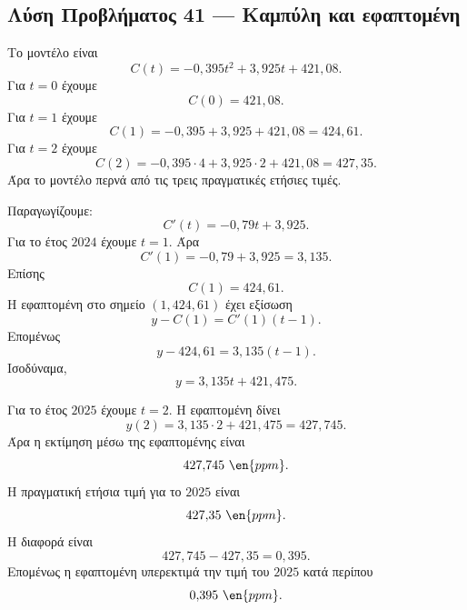\subsection*{Λύση Προβλήματος 41 --- Καμπύλη  και εφαπτομένη}

\begin{alist}
  \item Το μοντέλο είναι
        \[
          C(t)=-0{,}395t^2+3{,}925t+421{,}08.
        \]
        Για $t=0$ έχουμε
        \[
          C(0)=421{,}08.
        \]
        Για $t=1$ έχουμε
        \[
          C(1)=-0{,}395+3{,}925+421{,}08=424{,}61.
        \]
        Για $t=2$ έχουμε
        \[
          C(2)=-0{,}395\cdot4+3{,}925\cdot2+421{,}08=427{,}35.
        \]
        Άρα το μοντέλο περνά από τις τρεις πραγματικές ετήσιες τιμές.

  \item Παραγωγίζουμε:
        \[
          C'(t)=-0{,}79t+3{,}925.
        \]
        Για το έτος $2024$ έχουμε $t=1$. Άρα
        \[
          C'(1)=-0{,}79+3{,}925=3{,}135.
        \]
        Επίσης
        \[
          C(1)=424{,}61.
        \]
        Η εφαπτομένη στο σημείο $(1,424{,}61)$ έχει εξίσωση
        \[
          y-C(1)=C'(1)(t-1).
        \]
        Επομένως
        \[
          {y-424{,}61=3{,}135(t-1)}.
        \]
        Ισοδύναμα,
        \[
          {y=3{,}135t+421{,}475}.
        \]

  \item Για το έτος $2025$ έχουμε $t=2$. Η εφαπτομένη δίνει
        \[
          y(2)=3{,}135\cdot2+421{,}475=427{,}745.
        \]
        Άρα η εκτίμηση μέσω της εφαπτομένης είναι
        \[
          427{,}745\ \en{ppm}.
        \]
        Η πραγματική ετήσια τιμή για το $2025$ είναι
        \[
          427{,}35\ \en{ppm}.
        \]
        Η διαφορά είναι
        \[
          427{,}745-427{,}35=0{,}395.
        \]
        Επομένως η εφαπτομένη υπερεκτιμά την τιμή του $2025$ κατά
        περίπου
        \[
          {0{,}395\ \en{ppm}}.
        \]
\end{alist}
